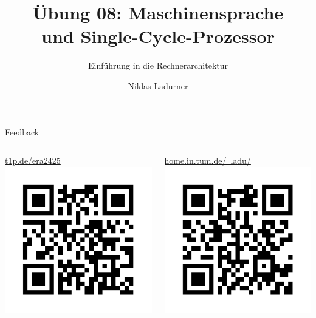 \documentclass[
  german,            %
  aspectratio=169,    %
]{tumbeamer}
\title{Übung 08: Maschinensprache \\und Single-Cycle-Prozessor}
\subtitle{Einführung in die Rechnerarchitektur}
\author{Niklas Ladurner}
\institute{\theChairName\\\theDepartmentName\\\theUniversityName}
\date{\DTMdisplaydate{2024}{12}{06}{-1}}
\begin{document}
\maketitle

\begin{frame}[c]{Feedback}{}
	\begin{columns}[c]
		\begin{column}{0.5\textwidth}
			\begin{center}
				\LARGE  \href{https://t1p.de/era2425}{t1p.de/era2425}\\
				\includegraphics[height=0.5\textheight]{feedback_qr.png}
			\end{center}
		\end{column}
		\begin{column}{0.5\textwidth}
			\begin{center}
				\LARGE  \href{https://home.in.tum.de/~ladu/}{home.in.tum.de/\string~ladu/}\\
				\includegraphics[height=0.5\textheight]{website_qr.png}
			\end{center}
		\end{column}
	\end{columns}
\end{frame}
\end{document}
